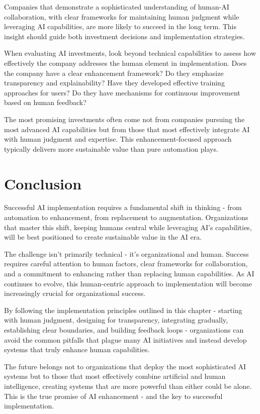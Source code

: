 \documentclass[
  Letterpaper,
]{scrbook}
\begin{document}
Companies that demonstrate a sophisticated understanding of human-AI
collaboration, with clear frameworks for maintaining human judgment
while leveraging AI capabilities, are more likely to succeed in the long
term. This insight should guide both investment decisions and
implementation strategies.

When evaluating AI investments, look beyond technical capabilities to
assess how effectively the company addresses the human element in
implementation. Does the company have a clear enhancement framework? Do
they emphasize transparency and explainability? Have they developed
effective training approaches for users? Do they have mechanisms for
continuous improvement based on human feedback?

The most promising investments often come not from companies pursuing
the most advanced AI capabilities but from those that most effectively
integrate AI with human judgment and expertise. This enhancement-focused
approach typically delivers more sustainable value than pure automation
plays.

\section{Conclusion}\label{conclusion}

Successful AI implementation requires a fundamental shift in thinking -
from automation to enhancement, from replacement to augmentation.
Organizations that master this shift, keeping humans central while
leveraging AI's capabilities, will be best positioned to create
sustainable value in the AI era.

The challenge isn't primarily technical - it's organizational and human.
Success requires careful attention to human factors, clear frameworks
for collaboration, and a commitment to enhancing rather than replacing
human capabilities. As AI continues to evolve, this human-centric
approach to implementation will become increasingly crucial for
organizational success.

By following the implementation principles outlined in this chapter -
starting with human judgment, designing for transparency, integrating
gradually, establishing clear boundaries, and building feedback loops -
organizations can avoid the common pitfalls that plague many AI
initiatives and instead develop systems that truly enhance human
capabilities.

The future belongs not to organizations that deploy the most
sophisticated AI systems but to those that most effectively combine
artificial and human intelligence, creating systems that are more
powerful than either could be alone. This is the true promise of AI
enhancement - and the key to successful implementation.
\end{document}
